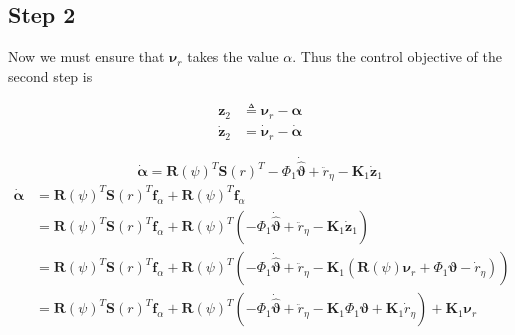 \documentclass[12pt,a4]{article}
\begin{document}
\subsection{Step 2}
Now we must ensure that $\bm{\nu}_r$ takes the value $\alpha$. Thus the control objective
of the second step is

\begin{align}
	\bm{z}_2       & \triangleq \bm{\nu}_r - \bm{\alpha}    \\
	\bm{\dot{z}}_2 & = \bm{\dot{\nu}}_r - \bm{\dot{\alpha}}
\end{align}

\begin{equation}
	\bm{\dot{\alpha}} =  \bm{R}(\psi)^T \bm{S}(r)^T - \Phi_1 \bm{\dot{\hat{\vartheta}}} + \ddot{r}_{\eta} - \bm{K}_1 \bm{\dot{z}}_1
\end{equation}
\begin{align}
	\bm{\dot{\alpha}} & =  \bm{R}(\psi)^T \bm{S}(r)^T \bm{f}_\alpha + \bm{R}(\psi)^T \bm{\dot{f}}_\alpha                                             \\
	                  & = \bm{R}(\psi)^T \bm{S}(r)^T \bm{f}_\alpha + \bm{R}(\psi)^T
	\left( - \Phi_1 \bm{\dot{\hat{\vartheta}}} + \ddot{r}_{\eta} - \bm{K}_1 \bm{\dot{z}}_1 \right)                                                   \\
	                  & = \bm{R}(\psi)^T \bm{S}(r)^T \bm{f}_\alpha + \bm{R}(\psi)^T
	\left( - \Phi_1 \bm{\dot{\hat{\vartheta}}} + \ddot{r}_{\eta} - \bm{K}_1 (\bm{R}(\psi)\bm{\nu}_r + \Phi_1\bm{\vartheta} - \dot{r}_{\eta}) \right) \\
	                  & = \bm{R}(\psi)^T \bm{S}(r)^T \bm{f}_\alpha +  \bm{R}(\psi)^T \left(
	- \Phi_1 \bm{\dot{\hat{\vartheta}}} + \ddot{r}_{\eta} - \bm{K}_1 \Phi_1\bm{\vartheta} + \bm{K}_1\dot{r}_{\eta}
	\right)+ \bm{K}_1 \bm{\nu}_r
\end{align}
\end{document}
